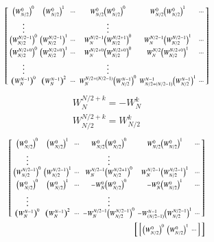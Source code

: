 \documentclass[journal,12pt,twocolumn]{IEEEtran}
\renewcommand\thesection{\arabic{section}}
\begin{document}
\begin{enumerate}[label=\thesection.\arabic*]
\begin{enumerate}[label=\arabic*.,ref=\thesection.\theenumi]
	\begin{align}
		\begin{bsmallmatrix}
			\left(W_{N/2}^{0}\right)^{0}	&	\left(W_{N/2}^{0}\right)^{1}	&	\cdots	&	W_{N/2}^0\left(W_{N/2}^{0}\right)^{0}	&	W_{N/2}^0\left(W_{N/2}^{0}\right)^{1}	&	\cdots\\
			\vdots	&&& \vdots\\
			\left(W_{N/2}^{N/2 - 1}\right)^{0}	&	\left(W_{N/2}^{N/2 - 1}\right)^{1}	&	\cdots	&	W_{N}^{N/2-1}\left(W_{N/2}^{N/2 + 1}\right)^{0}	&	W_{N}^{N/2-1}\left(W_{N/2}^{N/2 -1}\right)^{1}	&	\cdots\\
			\left(W_{N/2}^{N/2 + 0}\right)^{0}	&	\left(W_{N/2}^{N/2 + 0}\right)^{1}	&	\cdots	&	W_{N}^{N/2 + 0}\left(W_{N/2}^{N/2 + 0}\right)^{0}	&	W_{N}^{N/2}\left(W_{N/2}^{N/2+0}\right)^{1}	&	\cdots\\
			\vdots	&&& \vdots\\
			\left(W_{N}^{N-1}\right)^{0}	&	\left(W_{N}^{N-1}\right)^{2}	&	\cdots	&	W_{N}^{N/2 + (N/2-1)}\left(W_{N/2}^{N-1}\right)^{0}	&	W_{N/2 + (N/2-1)}^{N-1}\left(W_{N/2}^{N-1}\right)^{1}	&	\cdots
		\end{bsmallmatrix}
	\end{align}
	\begin{align}
		W_{N}^{N/2+k} = -W_{N}^{k}\\
		W_{N/2}^{N/2+k} = W_{N/2}^{k}
	\end{align}
	\begin{align}
		\begin{bsmallmatrix}
			\brak{W_{N/2}^{0}}^{0}	&	\brak{W_{N/2}^{0}}^{1}	&	\cdots	&	W_{N/2}^0\brak{W_{N/2}^{0}}^{0}	&	W_{N/2}^0\brak{W_{N/2}^{0}}^{1}	&	\cdots\\
			\vdots	&&& \vdots\\
			\brak{W_{N/2}^{N/2 - 1}}^{0}	&	\brak{W_{N/2}^{N/2 - 1}}^{1}	&	\cdots	&	W_{N}^{N/2-1}\brak{W_{N/2}^{N/2 + 1}}^{0}	&	W_{N}^{N/2-1}\brak{W_{N/2}^{N/2 -1}}^{1}	&	\cdots\\
			\brak{W_{N/2}^{0}}^{0}	&	\brak{W_{N/2}^{0}}^{1}	&	\cdots	&	-W_{N}^{0}\brak{W_{N/2}^{0}}^{0}	&	-W_{N}^{0}\brak{W_{N/2}^{0}}^{1}	&	\cdots\\
			\vdots	&&& \vdots\\
			\brak{W_{N}^{N-1}}^{0}	&	\brak{W_{N}^{N-1}}^{2}	&	\cdots	&	-W_{N}^{ N/2-1}\brak{W_{N/2}^{N/2-1}}^{0}	&	-W_{(N/2-1)}^{N-1}\brak{W_{N/2}^{N/2-1}}^{1}	&	\cdots
		\end{bsmallmatrix}\\
		\begin{bsmallmatrix}
			\begin{bsmallmatrix}
				\brak{W_{N/2}^{0}}^{0}	&	\brak{W_{N/2}^{0}}^{1} 	&	\cdots\\

\end{bsmallmatrix}
\end{bsmallmatrix}
\end{align}
\end{enumerate}
\end{enumerate}
\end{document}
